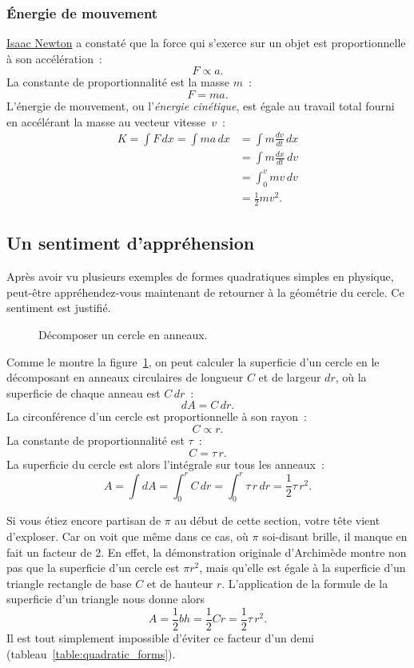     \subsubsection{Énergie de mouvement} %
    \label{sec:energy_of_motion}

\href{https://fr.wikipedia.org/wiki/Isaac_Newton}{Isaac Newton} a constaté que
la force qui s'exerce sur un objet est proportionnelle à son accélération~:
\[ F \propto a. \]
La constante de proportionnalité est la masse $m$~:
\[ F = m a. \]
L'énergie de mouvement, ou l'\emph{énergie cinétique}, est égale au travail
total fourni en accélérant la masse au vecteur vitesse~$v$~:
\[
\begin{split}
K = \int F\,dx = \int ma\,dx & = \int m\frac{dv}{dt}\,dx \\ & = \int m\frac{dx}{dt}\,dv \\ & = \int_0^v mv\,dv \\ & = \textstyle{\frac{1}{2}} mv^2.
\end{split}
\]

  \subsection{Un sentiment d'appréhension} %
  \label{sec:a_sense_of_foreboding}

Après avoir vu plusieurs exemples de formes quadratiques simples en physique, peut-être
appréhendez-vous maintenant de retourner à la géométrie du
cercle. Ce sentiment est justifié.

\begin{figure}
\begin{center}
\end{center}
\caption{Décomposer un cercle en anneaux.\label{fig:circular_area}}
\end{figure}


Comme le montre la figure~\ref{fig:circular_area}, on peut calculer la
superficie d'un cercle en le décomposant en anneaux circulaires de longueur $C$
et de largeur $dr$, où la superficie de chaque anneau est $C\,dr$~:
\[ dA = C\,dr. \]
La circonférence d'un cercle est proportionnelle à son rayon~:
\[ C \propto r. \]
La constante de proportionnalité est $\tau$~:
\[ C = \tau\,r. \]
La superficie du cercle est alors l'intégrale sur tous les anneaux~:
\[ A = \int dA = \int_0^r C\,dr = \int_0^r \tau\,r\,dr = \textstyle{\frac{1}{2}} \tau\,r^2. \]

Si vous étiez encore partisan de $\pi$ au début de cette section, votre tête vient
d'exploser. Car on voit que même dans ce cas, où $\pi$ soi-disant brille, il
manque en fait un facteur de 2. En effet, la démonstration originale
d'Archimède montre non pas que la superficie d'un cercle est $\pi r^2$, mais
qu'elle est égale à la superficie d'un triangle rectangle de base $C$ et de
hauteur $r$. L'application de la formule de la superficie d'un triangle nous donne
alors
\[
  A = \textstyle{\frac{1}{2}} bh = \textstyle{\frac{1}{2}}Cr = \textstyle{\frac{1}{2}}\tau\,r^2.
\]
Il est tout simplement impossible d'éviter ce facteur d'un demi
(tableau~\ref{table:quadratic_forms}).

